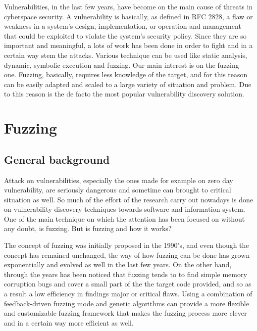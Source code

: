 

Vulnerabilities, in the last few years, have become on the main cause of threats in cyberspace security. 
A vulnerability is basically, as defined in RFC 2828, a flaw or weakness in a system's design, implementation, 
or operation and management that could be exploited to violate the system's security policy. 
Since they are so important and meaningful, a lots of work has been done in order to fight and in a certain way stem the attacks. 
Various technique can be used like static  analysis, dynamic, symbolic execution and fuzzing.
Our main interest is on the fuzzing one. Fuzzing, basically, requires less knowledge of the target, 
and for this reason can be easily adapted and scaled to a large variety of situation and problem. 
Due to this reason is the de facto the most popular vulnerability discovery solution.


\section{Fuzzing} %

\subsection{General background}

Attack on vulnerabilities, especially the ones made for example on zero day vulnerability, are seriously dangerous and sometime can brought to critical situation as well.
So much of the effort of the research carry out nowadays is done on vulnerability discovery techniques towards software and information system. One of the main technique on 
which the attention has been focused on without any doubt, is fuzzing. But is fuzzing and how it works? 

The concept of fuzzing was initially proposed in the 1990's, and even though the concept has remained unchanged,
the way of how fuzzing can be done has grown exponentially and evolved as well in the last few years. On the other hand, through the years has been noticed that fuzzing tends to
to find simple memory corruption bugs and cover a small part of the the target code provided, and so as a result a low efficiency in findings major or critical flaws.
Using a combination of feedback-driven fuzzing mode and genetic algorithms can provide a more flexible and customizable fuzzing framework that  makes the fuzzing process more clever and in a certain way more efficient as well.


